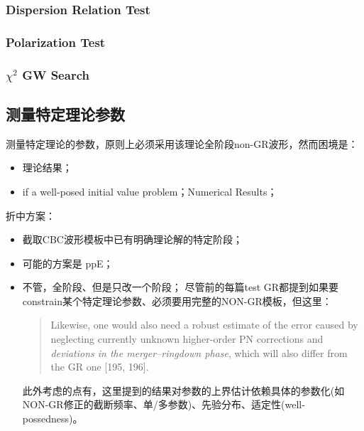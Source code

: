 \documentclass[CJK]{paper}  %
\begin{document}
\subsubsection{Dispersion Relation Test}


\subsubsection{Polarization Test}


\subsubsection{$\chi^2$ GW Search}

\subsection{测量特定理论参数}

\par 测量特定理论的参数，原则上必须采用该理论全阶段non-GR波形，然而困境是\cite{wf_modelling_for_LISA}：
\begin{itemize}
	\item [1. ] 理论结果；
	\item [2. ] if a well-posed initial value problem；Numerical Results；
\end{itemize}

\par 折中方案：
\begin{itemize}
	\item[1. ] 截取CBC波形模板中已有明确理论解的特定阶段；
	\item[2. ] 可能的方案是 ppE\cite{ppE}；
	\item[3. ] 不管，全阶段、但是只改一个阶段\cite{test_GR_GWTC3}；
	尽管\cite{test_GR_GWTC3}前的每篇test GR都提到如果要constrain某个特定理论参数、必须要用完整的NON-GR模板，但这里：
	\begin{quote}
		Likewise, one would also need a robust estimate of 
		the error caused by neglecting currently unknown higher-order
		PN corrections and \emph{deviations in the merger–ringdown phase},
		which will also differ from the GR one [195, 196].
	\end{quote}
	\par 此外考虑的点有，这里提到的结果对参数的上界估计依赖具体的参数化(如NON-GR修正的截断频率、单/多参数)、先验分布、适定性(well-possedness)。
\end{itemize}



\newpage
\end{document}
